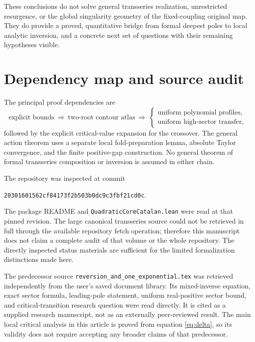 \documentclass[11pt,a4paper]{article}
\theoremstyle{definition}
\theoremstyle{remark}
\begin{document}
These conclusions do not solve general transseries realization,
unrestricted resurgence, or the global singularity geometry of the
fixed-coupling original map. They do provide a proved, quantitative
bridge from formal deepest poles to local analytic inversion, and a
concrete next set of questions with their remaining hypotheses visible.

\appendix
\section{Dependency map and source audit}
\label{app:audit}

The principal proof dependencies are
\[
 \text{explicit bounds}\ \Longrightarrow\ \text{two-root contour atlas}
 \ \Longrightarrow\
 \begin{cases}
   \text{uniform polynomial profiles},\\
   \text{uniform high-sector transfer},
 \end{cases}
\]
followed by the explicit critical-value expansion for the crossover.
The general action theorem uses a separate local fold-preparation lemma,
absolute Taylor convergence, and the finite positive-gap construction.
No general theorem of formal transseries composition or inversion is
assumed in either chain.

The repository was inspected at commit
\begin{center}
\small\texttt{20301601562cf84173f2b503b0dc9c3fbf21cd0c}.
\end{center}
The package README and \texttt{QuadraticCoreCatalan.lean} were read at that
pinned revision. The large canonical transseries source could not be
retrieved in full through the available repository fetch operation;
therefore this manuscript does not claim a complete audit of that
volume or the whole repository. The directly inspected status materials
are sufficient for the limited formalization distinctions made here.

The predecessor source \texttt{reversion\_and\_one\_exponential.tex} was
retrieved independently from the user's saved document library. Its
mixed-inverse equation, exact sector formula, leading-pole statement,
uniform real-positive sector bound, and critical-transition research
question were read directly. It is cited as a supplied research
manuscript, not as an externally peer-reviewed result. The main local
critical analysis in this article is proved from equation
\eqref{eq:delta}, so its validity does not require accepting any broader
claims of that predecessor.
\end{document}
